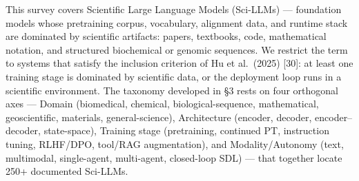 This survey covers Scientific Large Language Models (Sci-LLMs) --- foundation models whose pretraining corpus, vocabulary, alignment data, and runtime stack are dominated by scientific artifacts: papers, textbooks, code, mathematical notation, and structured biochemical or genomic sequences. We restrict the term to systems that satisfy the inclusion criterion of Hu et al.~(2025) {[}30{]}: at least one training stage is dominated by scientific data, or the deployment loop runs in a scientific environment. The taxonomy developed in §3 rests on four orthogonal axes --- Domain (biomedical, chemical, biological-sequence, mathematical, geoscientific, materials, general-science), Architecture (encoder, decoder, encoder--decoder, state-space), Training stage (pretraining, continued PT, instruction tuning, RLHF/DPO, tool/RAG augmentation), and Modality/Autonomy (text, multimodal, single-agent, multi-agent, closed-loop SDL) --- that together locate 250+ documented Sci-LLMs.
